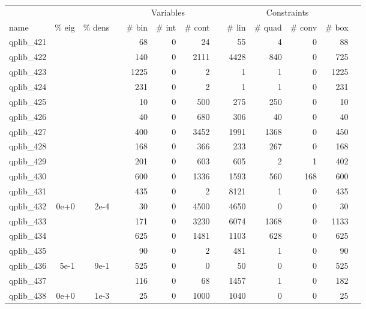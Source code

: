 \begin{table}
 \centering
 \setlength{\tabcolsep}{7pt}
 \renewcommand \arraystretch{1}
\begin{tabular}{lrrrrrrrrrrrr}
\toprule

		&		&		&	&	\multicolumn{3}{c}{Variables}					&	&	\multicolumn{4}{c}{Constraints}							\\
\cmidrule(lr){5-7} \cmidrule(lr){9-12}							 														
name	&	\% eig	&	\% dens	&	&	\# bin	&	\# int 	&	\# cont 	&	&	\# lin 	&	\# quad 	&	\# conv 	&	\# box	\\
\cmidrule(lr){5-7} \cmidrule(lr){9-12}																					
qplib\_421	&		&		&	&	68	&	0	&	24	&	&	55	&	4	&	0	&	88	\\
qplib\_422	&		&		&	&	140	&	0	&	2111	&	&	4428	&	840	&	0	&	725	\\
qplib\_423	&		&		&	&	1225	&	0	&	2	&	&	1	&	1	&	0	&	1225	\\
qplib\_424	&		&		&	&	231	&	0	&	2	&	&	1	&	1	&	0	&	231	\\
qplib\_425	&		&		&	&	10	&	0	&	500	&	&	275	&	250	&	0	&	10	\\
qplib\_426	&		&		&	&	40	&	0	&	680	&	&	306	&	40	&	0	&	40	\\
qplib\_427	&		&		&	&	400	&	0	&	3452	&	&	1991	&	1368	&	0	&	450	\\
qplib\_428	&		&		&	&	168	&	0	&	366	&	&	233	&	267	&	0	&	168	\\
qplib\_429	&		&		&	&	201	&	0	&	603	&	&	605	&	2	&	1	&	402	\\
qplib\_430	&		&		&	&	600	&	0	&	1336	&	&	1593	&	560	&	168	&	600	\\
qplib\_431	&		&		&	&	435	&	0	&	2	&	&	8121	&	1	&	0	&	435	\\
qplib\_432	&	0e+0	&	2e-4	&	&	30	&	0	&	4500	&	&	4650	&	0	&	0	&	30	\\
qplib\_433	&		&		&	&	171	&	0	&	3230	&	&	6074	&	1368	&	0	&	1133	\\
qplib\_434	&		&		&	&	625	&	0	&	1481	&	&	1103	&	628	&	0	&	625	\\
qplib\_435	&		&		&	&	90	&	0	&	2	&	&	481	&	1	&	0	&	90	\\
qplib\_436	&	5e-1	&	9e-1	&	&	525	&	0	&	0	&	&	50	&	0	&	0	&	525	\\
qplib\_437	&		&		&	&	116	&	0	&	68	&	&	1457	&	1	&	0	&	182	\\
qplib\_438	&	0e+0	&	1e-3	&	&	25	&	0	&	1000	&	&	1040	&	0	&	0	&	25	\\

\end{tabular}
\end{table}
